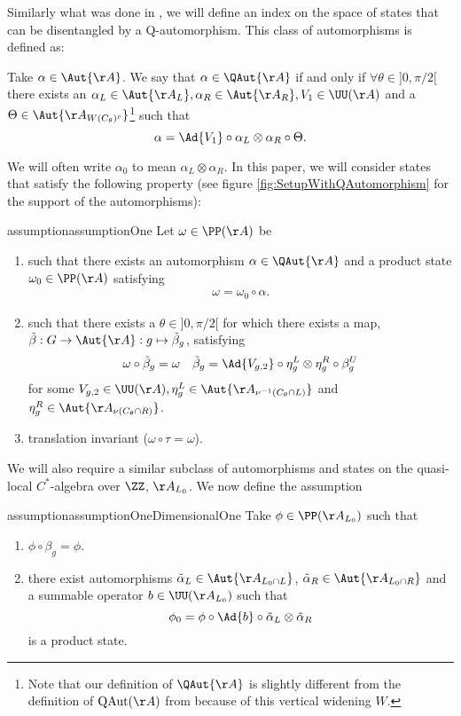 Similarly what was done in \cite{Ogata2d}, we will define an index on the space of states that can be disentangled by a Q-automorphism. This class of automorphisms is defined as:
\begin{definition}\label{def:QAut}
	Take $\alpha\in\Aut{\AA}$. We say that $\alpha\in\QAut{\AA}$ if and only if $\forall\theta\in]0,\pi/2[$ there exists an $\alpha_L\in\Aut{\AA_L},\alpha_R\in\Aut{\AA_R},V_1\in\UU(\AA)$ and a $\Theta\in\Aut{\AA_{W(C_\theta)^c}}$\footnote{Note that our definition of $\QAut{\AA}$ is slightly different from the definition of $\textrm{QAut}(\AA)$ from \cite{Ogata2d} because of this vertical widening $W$.} such that
	\begin{equation}
		\alpha=\Ad{V_1}\circ\alpha_L\otimes\alpha_R\circ\Theta.
	\end{equation}
\end{definition}
We will often write $\alpha_0$ to mean $\alpha_L\otimes\alpha_R$. In this paper, we will consider states that satisfy the following property (see figure \ref{fig:SetupWithQAutomorphism} for the support of the automorphisms):
\begin{restatable}{assumption}{assumptionOne}\label{assumption}
	Let $\omega\in\PP(\AA)$ be
	\begin{enumerate}
		\item such that there exists an automorphism $\alpha\in\QAut{\AA}$ and a product state $\omega_0\in\PP(\AA)$ satisfying
		\begin{align}
			\omega=\omega_0\circ\alpha.
		\end{align}
		\item such that there exists a $\theta\in]0,\pi/2[$ for which there exists a map, $\tilde\beta:G\rightarrow\Aut{\AA}:g\mapsto\tilde\beta_g$, satisfying
		\begin{align}\label{eq:DecompositionOfBetaTilde}
			\omega\circ\tilde\beta_g&=\omega&\tilde\beta_g=\Ad{V_{g,2}}\circ\eta^L_g\otimes\eta^R_g\circ\beta^U_g
		\end{align}
		for some $V_{g,2}\in\UU(\AA),\eta^L_g\in\Aut{\AA_{\nu^{-1}(C_\theta\cap L)}}$ and $\eta^R_g\in\Aut{\AA_{\nu(C_\theta\cap R)}}$.
		\item translation invariant ($\omega\circ\tau=\omega$).
	\end{enumerate}
\end{restatable}
We will also require a similar subclass of automorphisms and states on the quasi-local $C^*$-algebra over $\ZZ$, $\AA_{L_0}$. We now define the assumption
\begin{restatable}{assumption}{assumptionOneDimensionalOne}\label{assumption1d}
	Take $\phi\in\PP(\AA_{L_0})$ such that
	\begin{enumerate}
		\item $\phi\circ\beta_g=\phi$.
		\item there exist automorphisms $\tilde\alpha_L\in\Aut{\AA_{L_0\cap L}}$, $\tilde\alpha_R\in\Aut{\AA_{L_0\cap R}}$ and a summable operator $b\in\UU(\AA_{L_0})$ such that
		\begin{equation}
			\phi_0=\phi\circ\Ad{b}\circ\tilde\alpha_{L}\otimes\tilde\alpha_{R}
		\end{equation}
		is a product state.
	\end{enumerate}
\end{restatable}
